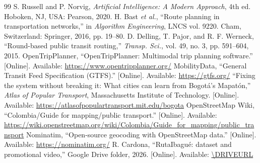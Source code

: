 \documentclass[10pt,twocolumn,letterpaper]{article}
\begin{document}
\begin{thebibliography}{99}
 S. Russell and P. Norvig, \emph{Artificial Intelligence: A Modern Approach}, 4th ed. Hoboken, NJ, USA: Pearson, 2020.
 H. Bast \emph{et al.}, ``Route planning in transportation networks,'' in \emph{Algorithm Engineering}, LNCS vol. 9220. Cham, Switzerland: Springer, 2016, pp. 19--80.
 D. Delling, T. Pajor, and R. F. Werneck, ``Round-based public transit routing,'' \emph{Transp. Sci.}, vol. 49, no. 3, pp. 591--604, 2015.
 OpenTripPlanner, ``OpenTripPlanner: Multimodal trip planning software.'' [Online]. Available: \url{https://www.opentripplanner.org/}
 MobilityData, ``General Transit Feed Specification (GTFS).'' [Online]. Available: \url{https://gtfs.org/}
 ``Fixing the system without breaking it: What cities can learn from Bogotá's Mapatón,'' \emph{Atlas of Popular Transport}, Massachusetts Institute of Technology. [Online]. Available: \url{https://atlasofpopulartransport.mit.edu/bogota}
 OpenStreetMap Wiki, ``Colombia/Guide for mapping/public transport.'' [Online]. Available: \url{https://wiki.openstreetmap.org/wiki/Colombia/Guide_for_mapping/public_transport}
 Nominatim, ``Open-source geocoding with OpenStreetMap data.'' [Online]. Available: \url{https://nominatim.org/}
 R. Cardona, ``RutaIbagué: dataset and promotional video,'' Google Drive folder, 2026. [Online]. Available: \url{\DRIVEURL}
\end{thebibliography}
\end{document}
